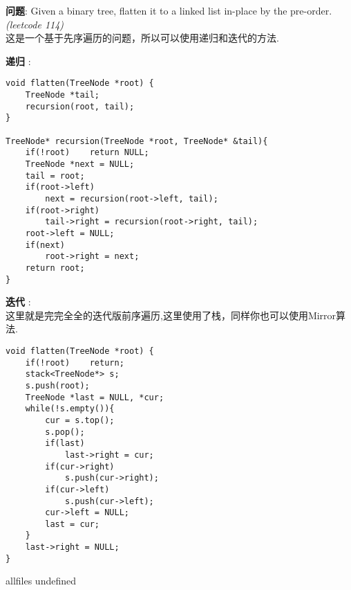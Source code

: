 \documentclass{article}
\begin{document}
\begin{CJK}{UTF8}{gbsn}     %

\else
    
\begin{description}
    \item{\textbf{问题}}: Given a binary tree, flatten it to a linked list in-place by the pre-order. \textit{(leetcode 114)}
    \\这是一个基于先序遍历的问题，所以可以使用递归和迭代的方法.
    \item{\textbf{递归}} : 
    \begin{lstlisting}
void flatten(TreeNode *root) {
    TreeNode *tail;
    recursion(root, tail);
}

TreeNode* recursion(TreeNode *root, TreeNode* &tail){
    if(!root)    return NULL;
    TreeNode *next = NULL;
    tail = root;
    if(root->left)
        next = recursion(root->left, tail);
    if(root->right)
        tail->right = recursion(root->right, tail);
    root->left = NULL;
    if(next)
        root->right = next;
    return root;
}
    \end{lstlisting}
    \item{\textbf{迭代}} : 
    \\这里就是完完全全的迭代版前序遍历,这里使用了栈，同样你也可以使用Mirror算法.
    \begin{lstlisting}
void flatten(TreeNode *root) {
    if(!root)    return;
    stack<TreeNode*> s;
    s.push(root);
    TreeNode *last = NULL, *cur;
    while(!s.empty()){
        cur = s.top();
        s.pop();
        if(last)
            last->right = cur;
        if(cur->right)
            s.push(cur->right);
        if(cur->left)
            s.push(cur->left);
        cur->left = NULL;
        last = cur;
    }
    last->right = NULL;
}
    \end{lstlisting}
\end{description}

\fi

\ifx allfiles undefined
\end{CJK}
\end{document}
